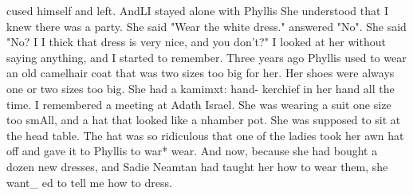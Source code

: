 cused himself and left. AndLI stayed alone with Phyllis 
She understood that I knew there was a party. She said "Wear the white dress." 
answered "No". She said "No? I I thick that dress is very nice, and you don't?" I 
looked at her without saying anything, and I started to remember. 
Three years ago Phyllis used to wear an old camelhair coat that was two sizes too 
big for her. Her shoes were always one or two sizes too big. She had a kamimxt: hand-
kerchief in her hand all the time. I remembered a meeting at Adath Israel. She was 
wearing a suit one size too smAll, and a hat that looked like a nhamber pot. She was 
supposed to sit at the head table. The hat was so ridiculous that one of the ladies 
took her awn hat off and gave it to Phyllis to war* wear. And now, because she had 
bought a dozen new dresses, and Sadie Neamtan had taught her how to wear them, she want_ 
ed to tell me how to dress. 
